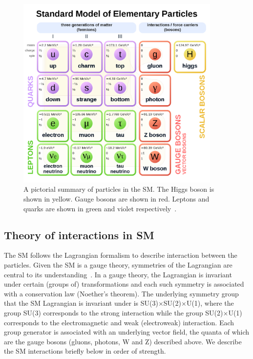 \begin{figure}[hbtp]
 \begin{center}
   \includegraphics[width=0.9\textwidth]{plots_and_figures/chapter2/SM_particles.pdf}
   \caption{A pictorial summary of particles in the SM. The Higgs boson is shown in yellow. Gauge bosons are shown in red. Leptons and quarks are shown in green and violet respectively~\cite{sm_zoo}.}
   \label{fig:sm_zoo}
 \end{center}
\end{figure}


\subsection{Theory of interactions in SM}
The SM follows the Lagrangian formalism to describe interaction between the particles. Given the SM is a gauge theory, symmetries of the Lagrangian are central to its understanding~\cite{th_muell}. In a gauge theory, the Lagrangian is invariant under certain (groups of) transformations and each such symmetry is associated with a conservation law (Noether's theorem). The underlying symmetry group that the SM Lagrangian is invariant under is SU(3)$\times$SU(2)$\times$U(1), where the group SU(3) corresponds to the strong interaction while the group SU(2)$\times$U(1) corresponds to the electromagnetic and weak (electroweak) interaction. Each group generator is associated with an underlying vector field, the quanta of which are the gauge bosons (gluons, photons, W and Z) described above. We describe the SM interactions briefly below in order of strength.

